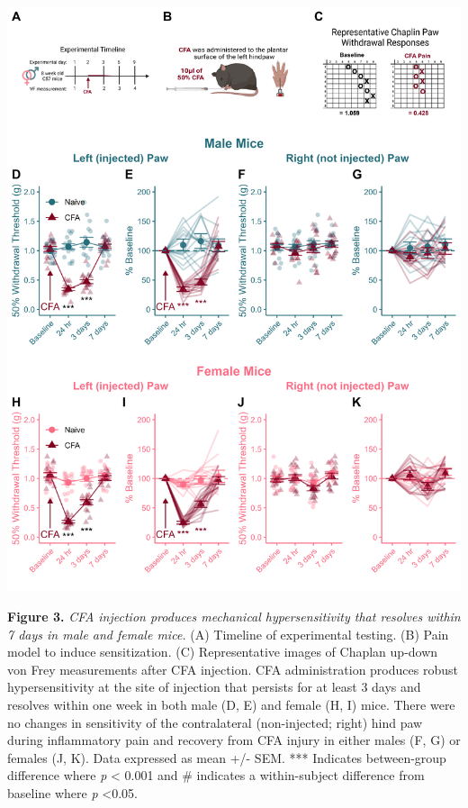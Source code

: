 \documentclass[
]{book}
\begin{document}
\begin{center}\includegraphics[width=68.06in]{Figs/3_VF_CFA_Recovery} \end{center}

\textbf{Figure 3.} \emph{CFA injection produces mechanical hypersensitivity that resolves within 7 days in male and female mice.} (A) Timeline of experimental testing. (B) Pain model to induce sensitization. (C) Representative images of Chaplan up-down von Frey measurements after CFA injection. CFA administration produces robust hypersensitivity at the site of injection that persists for at least 3 days and resolves within one week in both male (D, E) and female (H, I) mice. There were no changes in sensitivity of the contralateral (non-injected; right) hind paw during inflammatory pain and recovery from CFA injury in either males (F, G) or females (J, K). Data expressed as mean +/- SEM. *** Indicates between-group difference where \emph{p} \textless{} 0.001 and \# indicates a within-subject difference from baseline where \emph{p} \textless0.05.
\end{document}
